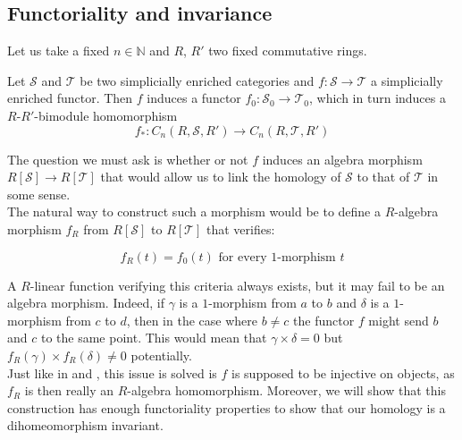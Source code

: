 \documentclass[a4paper,fleqn]{cas-sc}
\newtheorem{rem}{Remark}%
\newcommand{\cS}{{\mathcal{S}}}
\newcommand{\cT}{{\mathcal{T}}}
\begin{document}

\subsection{Functoriality and invariance}
Let us take a fixed $n \in \mathbb{N}$ and $R$, $R'$ two fixed commutative rings.

Let $\cS$ and $\cT$ be two simplicially enriched categories and $f : \cS \to \cT$ a simplicially enriched functor. Then $f$ induces a functor $f_0 : \cS_0 \to \cT_0$, which in turn induces a $R$-$R'$-bimodule homomorphism
\[
f_* : C_n \left( R, \cS , R' \right) \to C_n \left( R, \cT , R' \right)
\]

The question we must ask is whether or not $f$ induces an algebra morphism $R[\cS] \to R[\cT]$ that would allow us to link the homology of $\cS$ to that of $\cT$ in some sense.\\

The natural way to construct such a morphism would be to define a $R$-algebra morphism $f_R$ from $R[\cS]$ to $R[\cT]$ that verifies:

\[f_R ( t ) = f_0 (t) \text{ for every } 1\text{-morphism } t\]

A $R$-linear function verifying this criteria always exists, but it may fail to be an algebra morphism. Indeed, if $\gamma$ is a $1$-morphism from $a$ to $b$ and $\delta$ is a $1$-morphism from $c$ to $d$, then in the case where $b \neq c$ the functor $f$ might send $b$ and $c$ to the same point. This would mean that $\gamma \times \delta = 0$ but $f_R (\gamma) \times f_R ( \delta) \neq 0$ potentially.\\

Just like in \cite{semi-ab} and \cite{eric}, this issue is solved is $f$ is supposed to be injective on objects, as $f_R$ is then really an $R$-algebra homomorphism. Moreover, we will show that this construction has enough functoriality properties to show that our homology is a dihomeomorphism  invariant.
\end{document}
